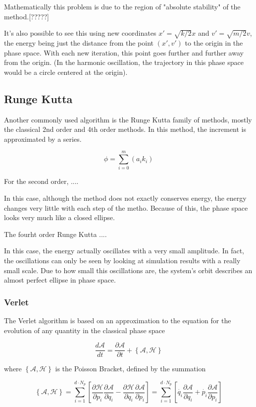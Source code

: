 Mathematically this problem is due to the region of "absolute stability" of the method.[?????]

It's also possible to see this using new coordinates $x' = \sqrt{k/2}x$ and $v' = \sqrt{m/2}v$, the energy being just the distance from the point $(x',v')$ to the origin in the phase space. With each new iteration, this point goes further and further away from the origin.
(In the harmonic oscillation, the trajectory in this phase space would be a circle centered at the origin).


\subsection{Runge Kutta}

Another commonly used algorithm is the Runge Kutta family of methods, mostly the classical 2nd order and 4th order methods. In this method, the increment is approximated by a series.

$$\phi = \sum_{i=0}^{m}(a_i k_i)$$

For the second order, ....

In this case, although the method does not exactly conserves energy, the energy changes very little with each step of the metho. Because of this, the phase space looks very much like a closed ellipse.

The fourht order Runge Kutta ....

In this case, the energy actually oscillates with a very small amplitude. In fact, the oscillations can only be seen by looking at simulation results with a really small scale. Due to how small this oscillations are, the system's orbit describes an almost perfect ellipse in phase space.

\subsubsection{Verlet}

The Verlet algorithm is based on an approximation to the equation for the evolution of any quantity in the classical phase space

$$\frac{d \mathcal{A}}{dt} = \frac{\partial \mathcal{A}}{\partial t} + \left\{\mathcal{A}, \mathcal{H} \right\}$$

where $\left\{\mathcal{A}, \mathcal{H} \right\}$ is the Poisson Bracket, defined by the summation

$$\left\{\mathcal{A}, \mathcal{H} \right\} = \sum_{i=1}^{d\cdot N_p} \left[ \frac{\partial \mathcal{H}}{\partial p_i}\frac{\partial \mathcal{A}}{\partial q_i} - \frac{\partial \mathcal{H}}{\partial q_i}\frac{\partial \mathcal{A}}{\partial p_i}\right] = \sum_{i=1}^{d\cdot N_p} \left[ \Dot{q_i} \frac{\partial \mathcal{A}}{\partial q_i} + \Dot{p_i}\frac{\partial \mathcal{A}}{\partial p_i}\right]$$

